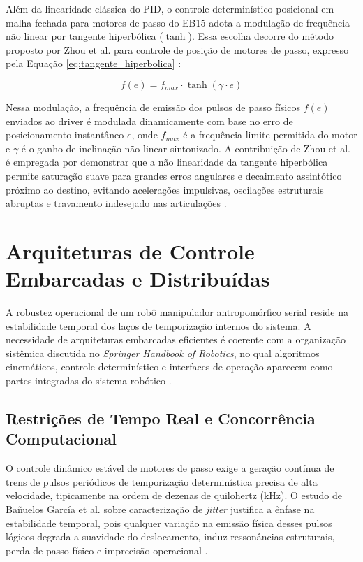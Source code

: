 Além da linearidade clássica do PID, o controle determinístico posicional em malha fechada para motores de passo do EB15 adota a modulação de frequência não linear por tangente hiperbólica ($\tanh$). Essa escolha decorre do método proposto por Zhou et al. para controle de posição de motores de passo, expresso pela Equação \ref{eq:tangente_hiperbolica} \cite{zhou2023frequency}:

\begin{equation}
\label{eq:tangente_hiperbolica}
f(e) = f_{max} \cdot \tanh(\gamma \cdot e)
\end{equation}

Nessa modulação, a frequência de emissão dos pulsos de passo físicos $f(e)$ enviados ao driver é modulada dinamicamente com base no erro de posicionamento instantâneo $e$, onde $f_{max}$ é a frequência limite permitida do motor e $\gamma$ é o ganho de inclinação não linear sintonizado. A contribuição de Zhou et al. é empregada por demonstrar que a não linearidade da tangente hiperbólica permite saturação suave para grandes erros angulares e decaimento assintótico próximo ao destino, evitando acelerações impulsivas, oscilações estruturais abruptas e travamento indesejado nas articulações \cite{zhou2023frequency}.

\section{Arquiteturas de Controle Embarcadas e Distribuídas}
\label{sec:arquiteturas_distribuidas}

A robustez operacional de um robô manipulador antropomórfico serial reside na estabilidade temporal dos laços de temporização internos do sistema. A necessidade de arquiteturas embarcadas eficientes é coerente com a organização sistêmica discutida no \textit{Springer Handbook of Robotics}, no qual algoritmos cinemáticos, controle determinístico e interfaces de operação aparecem como partes integradas do sistema robótico \cite{siciliano2016springer}.

\subsection{Restrições de Tempo Real e Concorrência Computacional}
\label{subsec:restricoes_tempo_real}

O controle dinâmico estável de motores de passo exige a geração contínua de trens de pulsos periódicos de temporização determinística precisa de alta velocidade, tipicamente na ordem de dezenas de quilohertz (kHz). O estudo de Bañuelos García et al. sobre caracterização de \textit{jitter} justifica a ênfase na estabilidade temporal, pois qualquer variação na emissão física desses pulsos lógicos degrada a suavidade do deslocamento, induz ressonâncias estruturais, perda de passo físico e imprecisão operacional \cite{banuelos2026timing}.


